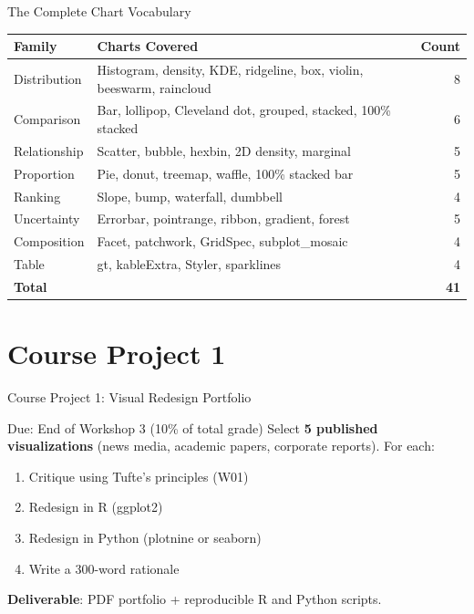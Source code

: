 \documentclass[10pt]{beamer}
\begin{document}
\begin{frame}{The Complete Chart Vocabulary}
  \centering
  {\small
  \begin{tabular}{llr}
    \toprule
    \textbf{Family} & \textbf{Charts Covered} & \textbf{Count} \\
    \midrule
    Distribution & Histogram, density, KDE, ridgeline, box, violin, beeswarm, raincloud & 8 \\
    Comparison & Bar, lollipop, Cleveland dot, grouped, stacked, 100\% stacked & 6 \\
    Relationship & Scatter, bubble, hexbin, 2D density, marginal & 5 \\
    Proportion & Pie, donut, treemap, waffle, 100\% stacked bar & 5 \\
    Ranking & Slope, bump, waterfall, dumbbell & 4 \\
    Uncertainty & Errorbar, pointrange, ribbon, gradient, forest & 5 \\
    Composition & Facet, patchwork, GridSpec, subplot\_mosaic & 4 \\
    Table & gt, kableExtra, Styler, sparklines & 4 \\
    \midrule
    \textbf{Total} & & \textbf{41} \\
    \bottomrule
  \end{tabular}}
\end{frame}

\section{Course Project 1}

\begin{frame}{Course Project 1: Visual Redesign Portfolio}
  \begin{alertblock}{Due: End of Workshop 3 (10\% of total grade)}
    Select \textbf{5 published visualizations} (news media, academic
    papers, corporate reports). For each:
    \begin{enumerate}
      \item Critique using Tufte's principles (W01)
      \item Redesign in R (ggplot2)
      \item Redesign in Python (plotnine or seaborn)
      \item Write a 300-word rationale
    \end{enumerate}
    \textbf{Deliverable}: PDF portfolio + reproducible R and Python scripts.
  \end{alertblock}
\end{frame}
\end{document}
